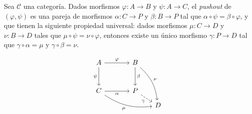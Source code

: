 \begin{definicion}
Sea $\mathcal{C}$ una categoría. Dados morfismos $\varphi \colon A \to B$ y $\psi \colon A \to C$, el \textit{pushout} de $(\varphi, \psi)$ es una pareja de morfismos $\alpha \colon C \to P$ y $\beta \colon B \to P$ tal que $\alpha \circ \psi = \beta \circ \varphi$, y que tienen la siguiente propiedad universal: dados morfismos $\mu \colon C \to D$ y $\nu \colon B \to D$ tales que $\mu \circ \psi = \nu \circ \varphi$, entonces existe un único morfismo $\gamma \colon P \to D$ tal que $\gamma \circ \alpha = \mu$ y $\gamma \circ \beta = \nu$.
\end{definicion}
\[
\begin{tikzcd}[row sep=large, column sep=large]
A \arrow[r, "\varphi"] \arrow[d, "\psi"'] & B \arrow[d, "\beta"] \arrow[ddr, "\nu", bend left=20] &[-0.7cm] \\
C \arrow[r, "\alpha"'] \arrow[rrd, "\mu"', bend right=20] & P \arrow[dr, dashed, "\gamma"'] & \\[-0.7cm]
& & D
\end{tikzcd}
\]
